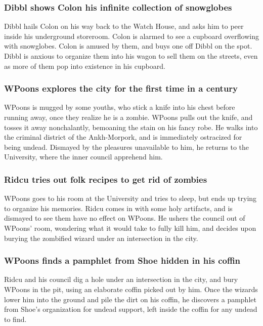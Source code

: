 \subsubsection{\Gls{Dibbl} shows \Gls{Colon} his infinite collection of snowglobes}
\Gls{Dibbl} hails \Gls{Colon} on his way back to the Watch House, and asks him to peer inside his
underground storeroom. \Gls{Colon} is alarmed to see a cupboard overflowing with snowglobes.
\Gls{Colon} is amused by them, and buys one off \Gls{Dibbl} on the spot. \Gls{Dibbl} is anxious to
organize them into his wagon to sell them on the streets, even as more of them pop into existence
in his cupboard.

\subsubsection{\Gls{WPoons} explores the city for the first time in a century}
\Gls{WPoons} is mugged by some youths, who stick a knife into his chest before running away, once
they realize he is a zombie. \Gls{WPoons} pulls out the knife, and tosses it away nonchalantly,
bemoaning the stain on his fancy robe. He walks into the criminal district of the Ankh-Morpork, and
is immediately ostracized for being undead. Dismayed by the pleasures unavailable to him, he returns
to the University, where the inner council apprehend him.

\subsubsection{\Gls{Ridcu} tries out folk recipes to get rid of zombies}
\Gls{WPoons} goes to his room at the University and tries to sleep, but ends up trying to organize
his memories. \Gls{Ridcu} comes in with some holy artifacts, and is dismayed to see them have no
effect on \Gls{WPoons}. He ushers the council out of \Gls{WPoons}' room, wondering what it would
take to fully kill him, and decides upon burying the zombified wizard under an intersection in the
city.

\subsubsection{\Gls{WPoons} finds a pamphlet from \Gls{Shoe} hidden in his coffin}
\Gls{Ridcu} and his council dig a hole under an intersection in the city, and bury \Gls{WPoons} in
the pit, using an elaborate coffin picked out by him. Once the wizards lower him into the ground
and pile the dirt on his coffin, he discovers a pamphlet from \Gls{Shoe}'s organization for
undead support, left inside the coffin for any undead to find.

